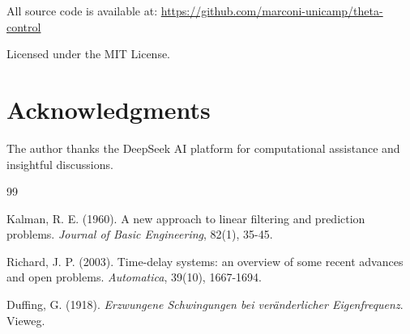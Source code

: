\documentclass[12pt,a4paper]{article}
\begin{document}
All source code is available at:
\url{https://github.com/marconi-unicamp/theta-control}

Licensed under the MIT License.

\section*{Acknowledgments}

The author thanks the DeepSeek AI platform for computational 
assistance and insightful discussions.


\begin{thebibliography}{99}

Kalman, R. E. (1960).
\newblock A new approach to linear filtering and prediction problems.
\newblock \textit{Journal of Basic Engineering}, 82(1), 35-45.

Richard, J. P. (2003).
\newblock Time-delay systems: an overview of some recent advances and open problems.
\newblock \textit{Automatica}, 39(10), 1667-1694.

Duffing, G. (1918).
\newblock \textit{Erzwungene Schwingungen bei veränderlicher Eigenfrequenz}.
\newblock Vieweg.

\end{thebibliography}
\end{document}
